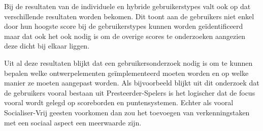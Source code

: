Bij de resultaten van de individuele en hybride gebruikerstypes valt ook op dat verschillende resultaten worden bekomen. Dit toont aan de gebruikers niet enkel door hun hoogste score bij de gebruikerstypes kunnen worden geïdentificeerd maar dat ook het ook nodig is om de overige scores te onderzoeken aangezien deze dicht bij elkaar liggen. 

Uit al deze resultaten blijkt dat een gebruikersonderzoek nodig is om te kunnen bepalen welke ontwerpelementen geïmplementeerd moeten worden en op welke manier ze moeten aangepast worden. Als bijvoorbeeld blijkt uit dit onderzoek dat de gebruikers vooral bestaan uit Presteerder-Spelers is het logischer dat de focus vooral wordt gelegd op scoreborden en puntensystemen. Echter als vooral Socialiser-Vrij geesten voorkomen dan zou het toevoegen van verkenningstaken met een sociaal aspect een meerwaarde zijn.



